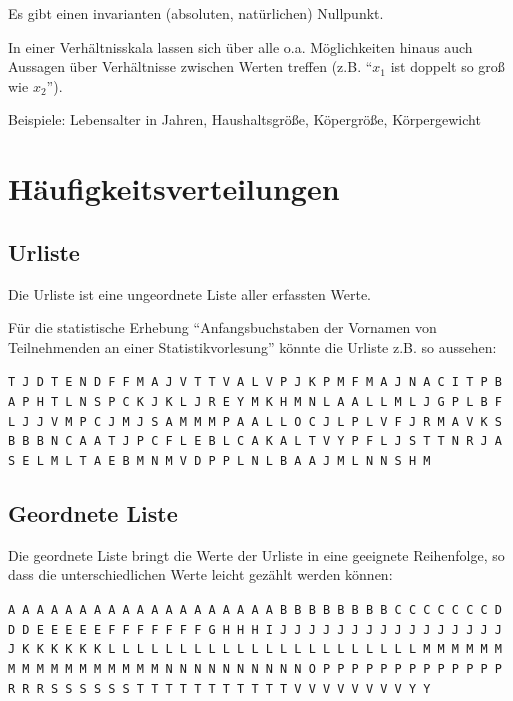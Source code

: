 \documentclass[
  11pt,
  ngerman,
  a4paper,
]{report}
\begin{document}
Es gibt einen invarianten (absoluten, natürlichen) Nullpunkt.

In einer Verhältnisskala lassen sich über alle o.a. Möglichkeiten hinaus auch Aussagen über Verhältnisse zwischen Werten treffen (z.B. \enquote{\(x_1\) ist doppelt so groß wie \(x_2\)}).

Beispiele: Lebensalter in Jahren, Haushaltsgröße, Köpergröße,
Körpergewicht

\hypertarget{huxe4ufigkeitsverteilungen}{%
\section{Häufigkeitsverteilungen}\label{huxe4ufigkeitsverteilungen}}

\nopagebreak

\hypertarget{urliste}{%
\subsection{Urliste}\label{urliste}}

Die Urliste ist eine ungeordnete Liste aller erfassten Werte.

Für die statistische Erhebung \enquote{Anfangsbuchstaben der Vornamen von Teilnehmenden an einer Statistikvorlesung} könnte die Urliste z.B. so aussehen:

\texttt{T\ J\ D\ T\ E\ N\ D\ F\ F\ M\ A\ J\ V\ T\ T\ V\ A\ L\ V\ P\ J\ K\ P\ M\ F\ M\ A\ J\ N\ A\ C\ I\ T\ P\ B\ A\ P\ H\ T\ L\ N\ S\ P\ C\ K\ J\ K\ L\ J\ R\ E\ Y\ M\ K\ H\ M\ N\ L\ A\ A\ L\ L\ M\ L\ J\ G\ P\ L\ B\ F\ L\ J\ J\ V\ M\ P\ C\ J\ M\ J\ S\ A\ M\ M\ M\ P\ A\ A\ L\ L\ O\ C\ J\ L\ P\ L\ V\ F\ J\ R\ M\ A\ V\ K\ S\ B\ B\ B\ N\ C\ A\ A\ T\ J\ P\ C\ F\ L\ E\ B\ L\ C\ A\ K\ A\ L\ T\ V\ Y\ P\ F\ L\ J\ S\ T\ T\ N\ R\ J\ A\ S\ E\ L\ M\ L\ T\ A\ E\ B\ M\ N\ M\ V\ D\ P\ P\ L\ N\ L\ B\ A\ A\ J\ M\ L\ N\ N\ S\ H\ M}

\hypertarget{geordnete-liste}{%
\subsection{Geordnete Liste}\label{geordnete-liste}}

Die geordnete Liste bringt die Werte der Urliste in eine geeignete Reihenfolge, so dass die unterschiedlichen Werte leicht gezählt werden können:

\texttt{A\ A\ A\ A\ A\ A\ A\ A\ A\ A\ A\ A\ A\ A\ A\ A\ A\ A\ A\ B\ B\ B\ B\ B\ B\ B\ B\ C\ C\ C\ C\ C\ C\ C\ D\ D\ D\ E\ E\ E\ E\ E\ F\ F\ F\ F\ F\ F\ F\ G\ H\ H\ H\ I\ J\ J\ J\ J\ J\ J\ J\ J\ J\ J\ J\ J\ J\ J\ J\ J\ J\ K\ K\ K\ K\ K\ K\ L\ L\ L\ L\ L\ L\ L\ L\ L\ L\ L\ L\ L\ L\ L\ L\ L\ L\ L\ L\ L\ L\ M\ M\ M\ M\ M\ M\ M\ M\ M\ M\ M\ M\ M\ M\ M\ M\ M\ N\ N\ N\ N\ N\ N\ N\ N\ N\ N\ O\ P\ P\ P\ P\ P\ P\ P\ P\ P\ P\ P\ P\ P\ R\ R\ R\ S\ S\ S\ S\ S\ S\ T\ T\ T\ T\ T\ T\ T\ T\ T\ T\ T\ V\ V\ V\ V\ V\ V\ V\ V\ Y\ Y}
\end{document}
